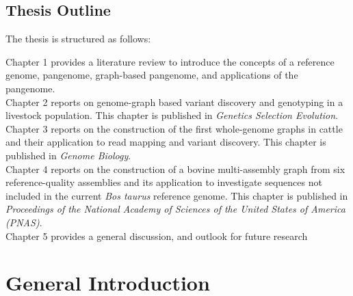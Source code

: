 \documentclass[11 pt, a4paper, notitlepage, twoside]{report}
\begin{document}
\newpage

{}
\section*{\LARGE{Thesis Outline}}
\thispagestyle{plain}

The thesis is structured as follows:

Chapter 1 provides a literature review to introduce the concepts of a reference genome, pangenome, graph-based pangenome, and applications of the pangenome. \\

Chapter 2 reports on genome-graph based variant discovery and genotyping in a livestock population. This chapter is published in \emph{Genetics Selection Evolution}. \\ 

Chapter 3 reports on the construction of the first whole-genome graphs in cattle and their application to read mapping and variant discovery. This chapter is published in \emph{Genome Biology}. \\

Chapter 4 reports on the construction of a bovine multi-assembly graph from six reference-quality assemblies and its application to investigate sequences not included in the current \emph{Bos taurus} reference genome. This chapter is published in \emph{Proceedings of the National Academy of Sciences of the United States of America (PNAS)}. \\


Chapter 5 provides a general discussion, and outlook for future research


\iftwoside
\cleardoublepage
\newpage
\fi

\newpage



\pagestyle{main}



\onehalfspacing




\chapter[General Introduction]{\LARGE{General Introduction}}
\label{chap:intro}
\end{document}
